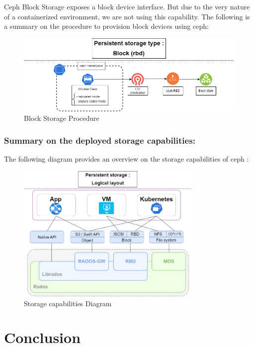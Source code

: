 \hspace{7mm}Ceph Block Storage exposes a block device interface. But due to the very nature of a containerized environment, we are not using this capability. The following is a summary on the procedure to provision block devices using ceph: 

\begin{figure}[H]\centering
\includegraphics[width=1.0\textwidth,angle=00]{assets/f33.png}
\caption{Block Storage Procedure}
\label{fig:Block Storage Procedure}
\end{figure}

\subsubsection{Summary on the deployed storage capabilities: }

\hspace{7mm}The following diagram provides an overview on the storage capabilities of ceph : 
\begin{figure}[H]\centering
\includegraphics[width=0.8\textwidth,angle=00]{assets/f30.png}
\caption{Storage capabilities Diagram}
\label{fig:f30}
\end{figure}
\section*{Conclusion}

